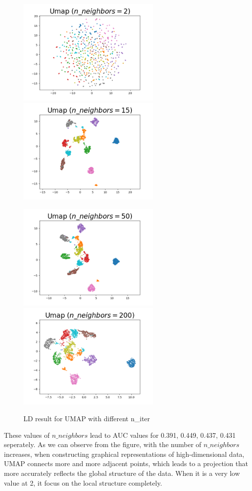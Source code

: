 \begin{figure}[H]
\centering  %
{
\label{Fig.sub.1}
\includegraphics[width=7cm,height=3.5cm\textwidth]{images/umap/umap_digit_n_neighbor_2.png}}
{
\label{Fig.sub.2}
\includegraphics[width=7cm,height=3.5cm\textwidth]{images/umap/umap_digit_n_neighbor_15.png}}

{
\label{Fig.sub.1}
\includegraphics[width=7cm,height=3.5cm\textwidth]{images/umap/umap_digit_n_neighbor_50.png}}
{
\label{Fig.sub.2}
\includegraphics[width=7cm,height=3.5cm\textwidth]{images/umap/umap_digit_n_neighbor_200.png}}
\caption{LD result for UMAP with different n\_iter}
\end{figure}

\noindent These values of $n\_neighbors$ lead to AUC values for 0.391, 0.449, 0.437, 0.431 seperately. As we can observe from the figure, with the number of $n\_neighbors$ increases, when constructing graphical representations of high-dimensional data, UMAP connects more and more adjacent points, which leads to a projection that more accurately reflects the global structure of the data. When it is a very low value at 2, it focus on the local structure completely. \\

